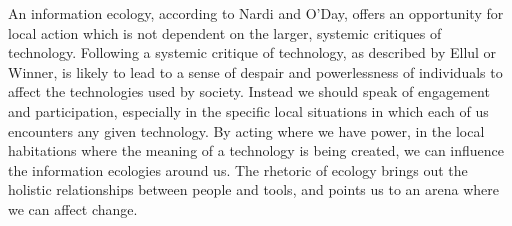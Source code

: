 An information ecology, according to Nardi and O'Day, offers an opportunity for local action which is not dependent on the larger, systemic critiques of technology.  Following a systemic critique of technology, as described by Ellul or Winner, is likely to lead to a sense of despair and powerlessness of individuals to affect the technologies used by society. Instead we should speak of engagement and participation, especially in the specific local situations in which each of us encounters any given technology. By acting where we have power, in the local habitations where the meaning of a technology is being created, we can influence the information ecologies around us. The rhetoric of ecology brings out the holistic relationships between people and tools, and points us to an arena where we can affect change.